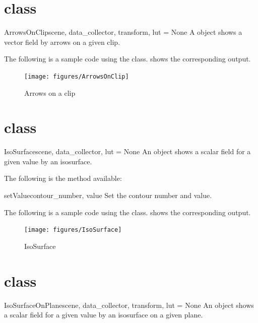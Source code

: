 \section{\ArrowsOnClip class}
\begin{classdesc}{ArrowsOnClip}{scene, data_collector, transform, lut = None}
A \ArrowsOnClip object shows a vector field by arrows on a given clip.
\end{classdesc}

The following is a sample code using the \ArrowsOnClip class.
 shows the corresponding output.


\begin{figure}[ht]
\begin{center}
\texttt{[image: figures/ArrowsOnClip]}
\end{center}
\caption{Arrows on a clip}
\label{fig:arrowsonclip.1}
\end{figure}


\section{\IsoSurface class}
\begin{classdesc}{IsoSurface}{scene, data_collector, lut = None}
An \IsoSurface object shows a scalar field for a given value by an isosurface.
\end{classdesc}

The following is the method available:

\begin{methoddesc}[IsoSurface]{setValue}{contour_number, value}
Set the contour number and value.
\end{methoddesc}

The following is a sample code using the \IsoSurface class.
 shows the corresponding output.


\begin{figure}[ht]
\begin{center}
\texttt{[image: figures/IsoSurface]}
\end{center}
\caption{IsoSurface}
\label{fig:isosurface.1}
\end{figure}

\section{\IsoSurfaceOnPlane class}
\begin{classdesc}{IsoSurfaceOnPlane}{scene, data_collector, transform, 
lut = None}
An \IsoSurfaceOnPlane object shows a scalar field for a given value 
by an isosurface on a given plane.
\end{classdesc}

